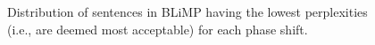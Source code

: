 \begin{figure}
    \centering
    \caption{Distribution of sentences in BLiMP \cite{warstadt-etal-2020-BLiMP-benchmark} having the lowest perplexities (i.e., are deemed most acceptable) for each phase shift.}
    \label{fig:ppl_density_main}
\end{figure}
